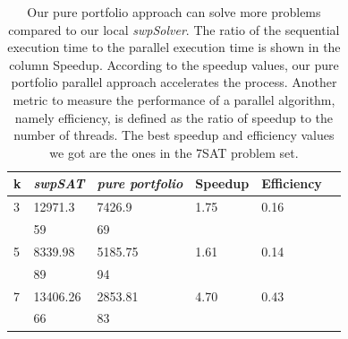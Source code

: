 \documentclass[12pt,a4paper,twoside]{scrartcl}
\numberwithin{equation}{section}
\begin{document}
   \begin{table}[H]
   \label{tab:UNIF}
\begin{center}
    \begin{tabular}{|l|l|l|l|l|p{3cm}|}
\hline 

    k &\emph{swpSAT}&\emph{pure portfolio}&Speedup&Efficiency\\ \hline      
    3 &12971.3&7426.9 & 1.75& 0.16 \\ 
    &59&69&&\\ \hline
    5&8339.98&5185.75&1.61&0.14\\ 
    &89&94&&\\ \hline
    7&13406.26&2853.81&4.70&0.43\\
    &66&83&&\\ \hline
	
\end{tabular}
\end{center}
\caption{Our pure portfolio approach can solve more problems compared to our local \emph{swpSolver}.  The ratio of the sequential execution time to the parallel execution time is shown in the column Speedup. According to the speedup values, our pure portfolio parallel approach accelerates the process.  Another metric to measure the performance of a parallel algorithm, namely efficiency, is defined as the ratio of speedup to the number of threads. The best speedup and efficiency values we got are the ones in the 7SAT problem set. 
}
\end{table}
\end{document}

